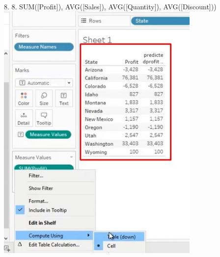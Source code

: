 \documentclass[preprint,12pt]{elsarticle}
\begin{document}
\begin{itemize}
				\\ 8. 8. SUM([Profit]), AVG([Sales]), AVG([Quantity]), AVG([Discount]))
					\\	\includegraphics[width=10cm]{./IMAGENES/8.6}
			\end{itemize}	
		
\end{document}
